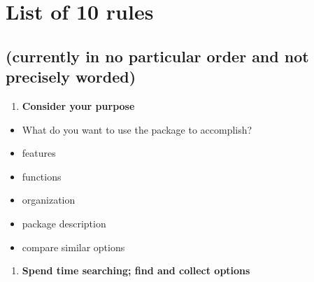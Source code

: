 \documentclass[10pt,letterpaper]{article}
\providecommand{\tightlist}{%
  \setlength{\itemsep}{0pt}\setlength{\parskip}{0pt}}
\begin{document}
\hypertarget{list-of-10-rules}{%
\section{List of 10 rules}\label{list-of-10-rules}}

\hypertarget{currently-in-no-particular-order-and-not-precisely-worded}{%
\subsection{(currently in no particular order and not precisely
worded)}\label{currently-in-no-particular-order-and-not-precisely-worded}}

\begin{enumerate}
\def\labelenumi{\arabic{enumi}.}
\tightlist
\item
  \textbf{Consider your purpose}
\end{enumerate}

\begin{itemize}
\tightlist
\item
  What do you want to use the package to accomplish?
\item
  features
\item
  functions
\item
  organization
\item
  package description
\item
  compare similar options
\end{itemize}

\begin{enumerate}
\def\labelenumi{\arabic{enumi}.}
\setcounter{enumi}{1}
\tightlist
\item
  \textbf{Spend time searching; find and collect options}
\end{enumerate}
\end{document}
